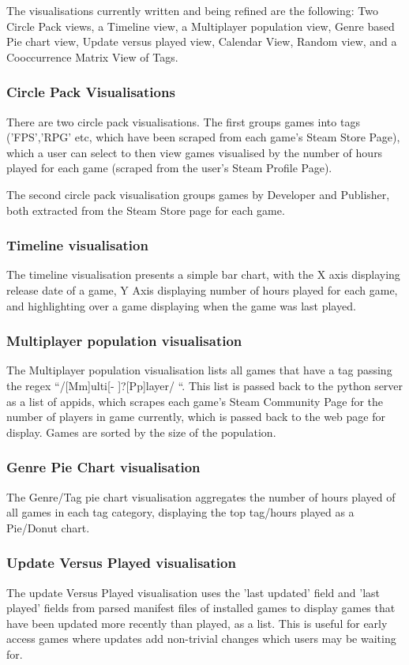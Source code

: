 \documentclass[11pt]{article}
\begin{document}
The visualisations currently written and being refined are the following: Two Circle Pack views, a Timeline view, a Multiplayer population view, Genre based Pie chart view, Update versus played view, Calendar View, Random view, and a Cooccurrence Matrix View of Tags.

\subsubsection*{Circle Pack Visualisations}
There are two circle pack visualisations. The first groups games into tags ('FPS','RPG' etc, which have been scraped from each game's Steam Store Page), which a user can select to then view games visualised by the number of hours played for each game (scraped from the user's Steam Profile Page).

The second circle pack visualisation groups games by Developer and Publisher, both extracted from the Steam Store page for each game.

\subsubsection*{Timeline visualisation}
The timeline visualisation presents a simple bar chart, with the X axis displaying release date of a game, Y Axis displaying number of hours played for each game, and highlighting over a game displaying when the game was last played.

\subsubsection*{Multiplayer population visualisation}
The Multiplayer population visualisation lists all games that have a tag passing the regex ``/[Mm]ulti[- ]?[Pp]layer/ ``. This list is passed back to the python server as a list of appids, which scrapes each game's Steam Community Page for the number of players in game currently, which is passed back to the web page for display. Games are sorted by the size of the population.

\subsubsection*{Genre Pie Chart visualisation}
The Genre/Tag pie chart visualisation aggregates the number of hours played of all games in each tag category, displaying the top tag/hours played as a Pie/Donut chart.

\subsubsection*{Update Versus Played visualisation}
The update Versus Played visualisation uses the 'last updated' field and 'last played' fields from parsed manifest files of installed games to display games that have been updated more recently than played, as a list. This is useful for early access games where updates add non-trivial changes which users may be waiting for.
\end{document}
